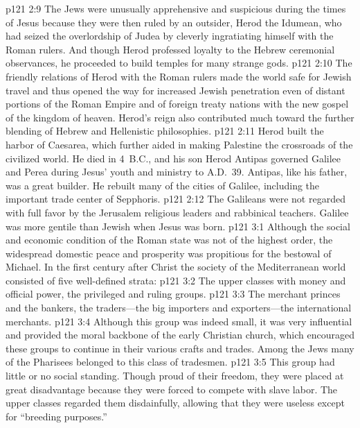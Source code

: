 \pc \vs p121 2:9 The Jews were unusually apprehensive and suspicious during the times of Jesus because they were then ruled by an outsider, Herod the Idumean, who had seized the overlordship of Judea by cleverly ingratiating himself with the Roman rulers. And though Herod professed loyalty to the Hebrew ceremonial observances, he proceeded to build temples for many strange gods.
\vs p121 2:10 The friendly relations of Herod with the Roman rulers made the world safe for Jewish travel and thus opened the way for increased Jewish penetration even of distant portions of the Roman Empire and of foreign treaty nations with the new gospel of the kingdom of heaven. Herod’s reign also contributed much toward the further blending of Hebrew and Hellenistic philosophies.
\vs p121 2:11 Herod built the harbor of Caesarea, which further aided in making Palestine the crossroads of the civilized world. He died in 4~B.C., and his son Herod Antipas governed Galilee and Perea during Jesus’ youth and ministry to A.D.~39. Antipas, like his father, was a great builder. He rebuilt many of the cities of Galilee, including the important trade center of Sepphoris.
\vs p121 2:12 The Galileans were not regarded with full favor by the Jerusalem religious leaders and rabbinical teachers. Galilee was more gentile than Jewish when Jesus was born.
\vs p121 3:1 Although the social and economic condition of the Roman state was not of the highest order, the widespread domestic peace and prosperity was propitious for the bestowal of Michael. In the first century after Christ the society of the Mediterranean world consisted of five well\hyp{}defined strata:
\pc \vs p121 3:2 \bibnobreakspace {} The upper classes with money and official power, the privileged and ruling groups.
\pc \vs p121 3:3 \bibnobreakspace {} The merchant princes and the bankers, the traders---the big importers and exporters---the international merchants.
\pc \vs p121 3:4 \bibnobreakspace {} Although this group was indeed small, it was very influential and provided the moral backbone of the early Christian church, which encouraged these groups to continue in their various crafts and trades. Among the Jews many of the Pharisees belonged to this class of tradesmen.
\pc \vs p121 3:5 \bibnobreakspace {} This group had little or no social standing. Though proud of their freedom, they were placed at great disadvantage because they were forced to compete with slave labor. The upper classes regarded them disdainfully, allowing that they were useless except for “breeding purposes.”

